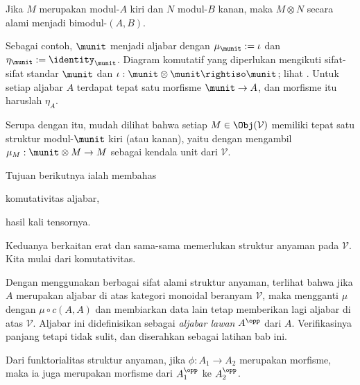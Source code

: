 Jika $M$ merupakan modul-$A$ kiri dan $N$ modul-$B$ kanan, maka $M\otimes N$
secara alami menjadi bimodul-$(A,B)$.

\begin{catatan}\label{rem:unit-algebra}
	Sebagai contoh, $\munit$ menjadi aljabar dengan
	$\mu_{\munit}:=\iota$ dan $\eta_{\munit}:=\identity_{\munit}$. Diagram
	komutatif yang diperlukan mengikuti sifat-sifat standar $\munit$ dan
	$\iota:\munit\otimes\munit\rightiso\munit$; lihat
	\cite[Lema 3.1.5]{Li1}. Untuk setiap aljabar $A$ terdapat tepat satu
	morfisme $\munit\to A$, dan morfisme itu haruslah $\eta_A$.
	
	Serupa dengan itu, mudah dilihat bahwa setiap $M\in\Obj(\mathcal{V})$
	memiliki tepat satu struktur modul-$\munit$ kiri (atau kanan), yaitu dengan
	mengambil $\mu_M:\munit\otimes M\to M$ sebagai kendala unit dari
	$\mathcal{V}$.
\end{catatan}

Tujuan berikutnya ialah membahas
\begin{inparaenum}[(a)]
	\item komutativitas aljabar,
	\item hasil kali tensornya.
\end{inparaenum}
Keduanya berkaitan erat dan sama-sama memerlukan struktur anyaman pada
$\mathcal{V}$. Kita mulai dari komutativitas.

\begin{definisi}\label{def:opposite-braided-algebra}
	Dengan menggunakan berbagai sifat alami struktur anyaman, terlihat bahwa
	jika $A$ merupakan aljabar di atas kategori monoidal beranyam $\mathcal{V}$,
	maka mengganti $\mu$ dengan $\mu\circ c(A,A)$ dan membiarkan data lain tetap
	memberikan lagi aljabar di atas $\mathcal{V}$. Aljabar ini didefinisikan
	sebagai \emph{aljabar lawan} $A^{\opp}$ dari $A$. Verifikasinya panjang
	tetapi tidak sulit, dan diserahkan sebagai latihan bab ini.
\end{definisi}

Dari funktorialitas struktur anyaman, jika $\phi:A_1\to A_2$ merupakan
morfisme, maka ia juga merupakan morfisme dari $A_1^{\opp}$ ke
$A_2^{\opp}$.

